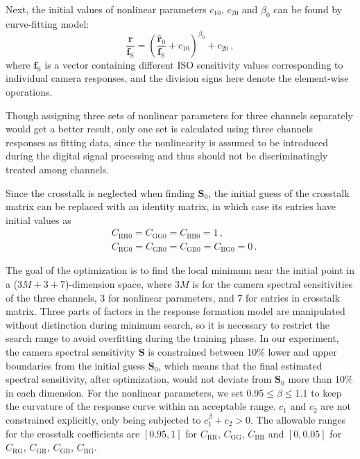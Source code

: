 \documentclass[9pt,twocolumn,twoside]{osajnl}
\begin{document}
Next, the initial values of nonlinear parameters $c_{10}$, $c_{20}$ and $\beta_0$ can be found by curve-fitting model:
\begin{equation}
\frac{\mathbf{r}}{\mathbf{f}_\text{S}} = \left(\frac{\hat{\mathbf{r}}_0}{\mathbf{f}_\text{S}} + c_{10}\right)^{\beta_0} + c_{20}\,,
\label{eq:24}
\end{equation}
where $\mathbf{f}_\text{S}$ is a vector containing different ISO sensitivity values corresponding to individual camera responses, and the division signs here denote the element-wise operations.

Though assigning three sets of nonlinear parameters for three channels separately would get a better result, only one set is calculated using three channels responses as fitting data, since the nonlinearity is assumed to be introduced during the digital signal processing and thus should not be discriminatingly treated among channels.

Since the crosstalk is neglected when finding $\mathbf{S}_0$, the initial guess of the crosstalk matrix can be replaced with an identity matrix, in which case its entries have initial values as
\begin{equation}
\begin{split}
& C_{\text{RR}0} = C_{\text{GG}0} = C_{\text{BB}0} = 1\,, \\
& C_{\text{RG}0} = C_{\text{GR}0} = C_{\text{GB}0} = C_{\text{BG}0} = 0\,.
\end{split}
\label{eq:25}
\end{equation}

The goal of the optimization is to find the local minimum near the initial point in a ($3M+3+7$)-dimension space, where $3M$ is for the camera spectral sensitivities of the three channels, 3 for nonlinear parameters, and 7 for entries in crosstalk matrix. Three parts of factors in the response formation model are manipulated without distinction during minimum search, so it is necessary to restrict the search range to avoid overfitting during the training phase. In our experiment, the camera spectral sensitivity $\mathbf{S}$ is constrained between 10\% lower and upper boundaries from the initial guess $\mathbf{S}_0$, which means that the final estimated spectral sensitivity, after optimization, would not deviate from $\mathbf{S}_0$ more than 10\% in each dimension. For the nonlinear parameters, we set $0.95\le\beta\le1.1$ to keep the curvature of the response curve within an acceptable range. $c_1$ and $c_2$ are not constrained explicitly, only being subjected to $c_1^\beta + c_2 > 0$. The allowable ranges for the crosstalk coefficients are $[0.95, 1]$ for $C_\text{RR}$, $C_\text{GG}$, $C_\text{BB}$ and $[0, 0.05]$ for $C_\text{RG}$, $C_\text{GR}$, $C_\text{GB}$, $C_\text{BG}$.
\end{document}
